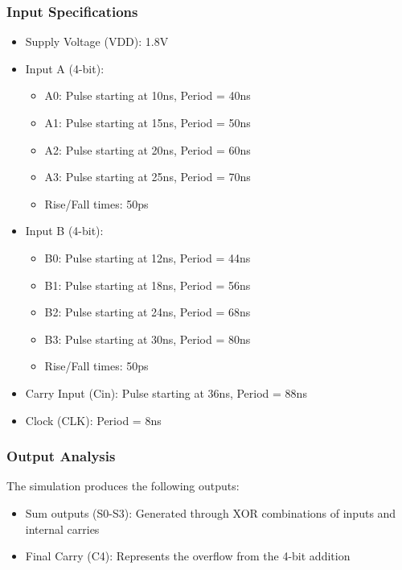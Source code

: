 \documentclass[conference]{IEEEtran}
\begin{document}
\subsubsection{Input Specifications}
\begin{itemize}
    \item Supply Voltage (VDD): 1.8V
    \item Input A (4-bit):
    \begin{itemize}
        \item A0: Pulse starting at 10ns, Period = 40ns
        \item A1: Pulse starting at 15ns, Period = 50ns
        \item A2: Pulse starting at 20ns, Period = 60ns
        \item A3: Pulse starting at 25ns, Period = 70ns
        \item Rise/Fall times: 50ps
    \end{itemize}
    
    \item Input B (4-bit):
    \begin{itemize}
        \item B0: Pulse starting at 12ns, Period = 44ns
        \item B1: Pulse starting at 18ns, Period = 56ns
        \item B2: Pulse starting at 24ns, Period = 68ns
        \item B3: Pulse starting at 30ns, Period = 80ns
        \item Rise/Fall times: 50ps
    \end{itemize}
    \item Carry Input (Cin): Pulse starting at 36ns, Period = 88ns
    \item Clock (CLK): Period = 8ns
\end{itemize}

\subsubsection{Output Analysis}
The simulation produces the following outputs:
\begin{itemize}
    \item Sum outputs (S0-S3): Generated through XOR combinations of inputs and internal carries
    \item Final Carry (C4): Represents the overflow from the 4-bit addition
\end{itemize}
\end{document}
